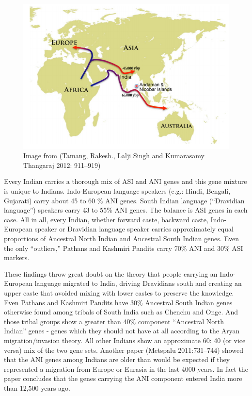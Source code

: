 \begin{figure}[!htbp]
\includegraphics[scale=1.2]{"images/7-02.jpg"}
\caption{Image from (Tamang, Rakesh., Lalji Singh and Kumarasamy Thangaraj 2012: 911–919)}\label{art7-fig02}
\end{figure}

Every Indian carries a thorough mix of ASI and ANI genes and this gene mixture is unique to Indians. Indo-European language speakers (e.g.: Hindi, Bengali, Gujarati) carry about 45 to 60 \% ANI genes. South Indian language (“Dravidian language”) speakers carry 43 to 55\% ANI genes. The balance is ASI genes in each case. All in all, every Indian, whether forward caste, backward caste, Indo-European speaker or Dravidian language speaker carries approximately equal proportions of Ancestral North Indian and Ancestral South Indian genes. Even the only “outliers,” Pathans and Kashmiri Pandits carry 70\% ANI and 30\% ASI markers.

These findings throw great doubt on the theory that people carrying an Indo-European language migrated to India, driving Dravidians south and creating an upper caste that avoided mixing with lower castes to preserve the knowledge. Even Pathans and Kashmiri Pandits have 30\% Ancestral South Indian genes otherwise found among tribals of South India such as Chenchu and Onge. And those tribal groups show a greater than 40\% component “Ancestral North Indian” genes - genes which they should not have at all according to the Aryan migration/invasion theory. All other Indians show an approximate 60: 40 (or vice versa) mix of the two gene sets. Another paper (Metspalu 2011:731–744) showed that the ANI genes among Indians are older than would be expected if they represented a migration from Europe or Eurasia in the last 4000 years. In fact the paper concludes that the genes carrying the ANI component entered India more than 12,500 years ago.

